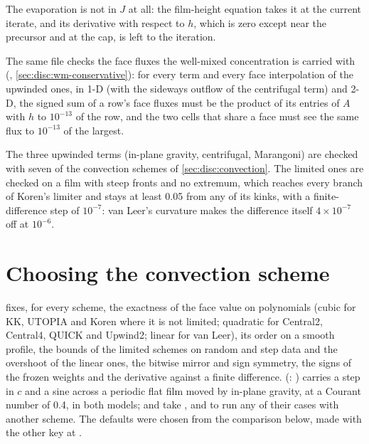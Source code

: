The evaporation is not in $J$ at all: the film-height equation takes it at
the current iterate, and its derivative with respect to $h$, which is zero
except near the precursor and at the cap, is left to the iteration.

The same file checks the face fluxes the well-mixed concentration is carried
with (, \cref{sec:disc:wm-conservative}): for every term and
every face interpolation of the upwinded ones, in 1-D (with the sideways
outflow of the centrifugal term) and 2-D, the signed sum of a row's face
fluxes must be the product of its entries of $A$ with $h$ to $10^{-13}$ of the
row, and the two cells that share a face must see the same flux to
$10^{-13}$ of the largest.

The three upwinded terms (in-plane gravity, centrifugal, Marangoni) are
checked with seven of the convection schemes of \cref{sec:disc:convection}.
The limited ones are checked on a film with steep fronts and no extremum,
which reaches every branch of Koren's limiter and stays at least 0.05 from
any of its kinks, with a finite-difference step of $10^{-7}$: van Leer's
curvature makes the difference itself $4\times10^{-7}$ off at $10^{-6}$.

\section{Choosing the convection scheme}
\label{sec:verification:schemes}

 fixes, for every scheme, the exactness
of the face value on polynomials (cubic for KK, UTOPIA and Koren where it is
not limited; quadratic for Central2, Central4, QUICK and Upwind2; linear for
van Leer), its order on a smooth profile, the bounds of the limited schemes on
random and step data and the overshoot of the linear ones, the bitwise mirror
and sign symmetry, the signs of the frozen weights and the derivative against
a finite difference.  (: )
carries a step in $c$ and a sine across a periodic flat film moved by in-plane
gravity, at a Courant number of 0.4, in both models;  and
 take ,  and
 to run any of their cases with another scheme. The defaults
were chosen from the comparison below, made with the other key at
.

